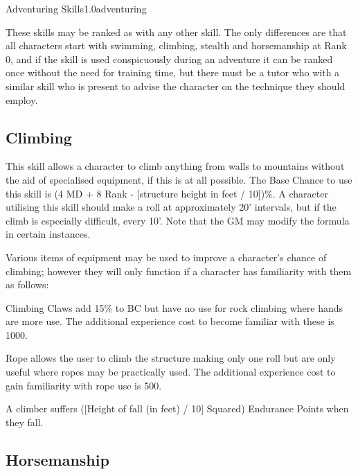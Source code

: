 \begin{skill}{Adventuring Skills}{1.0}{adventuring}

These skills may be ranked as with any other skill.  The only
differences are that all characters start with swimming, climbing,
stealth and horsemanship at Rank 0, and if the skill is used
conspicuously during an adventure it can be ranked once without the
need for training time, but there must be a tutor who with a similar
skill who is present to advise the character on the technique they
should employ.


\subsection{Climbing}
\label{climbing}
\label{falling}


This skill allows a character to climb anything from walls to
mountains without the aid of specialised equipment, if this is at all
possible.  The Base Chance to use this skill is (4 \x MD + 8 \x Rank -
[structure height in feet / 10])\%.  A character utilising this skill
should make a roll at approximately 20' intervals, but if the climb is
especially difficult, every 10'. Note that the GM may modify the
formula in certain instances.

Various items of equipment may be used to improve a character's chance
of climbing; however they will only function if a character has
familiarity with them as follows:
\begin{Enumerate}
\item
Climbing Claws add 15\% to BC but have no use for rock climbing where
hands are more use. The additional experience cost to become familiar
with these is 1000.

\item
Rope allows the user to climb the structure making only one roll but
are only useful where ropes may be practically used.  The additional
experience cost to gain familiarity with rope use is 500.

\item
A climber suffers ([Height of fall (in feet) / 10] Squared) Endurance
Points when they fall.
\end{Enumerate}


\subsection{Horsemanship}
\label{skills:horsemanship}


\end{skill}
